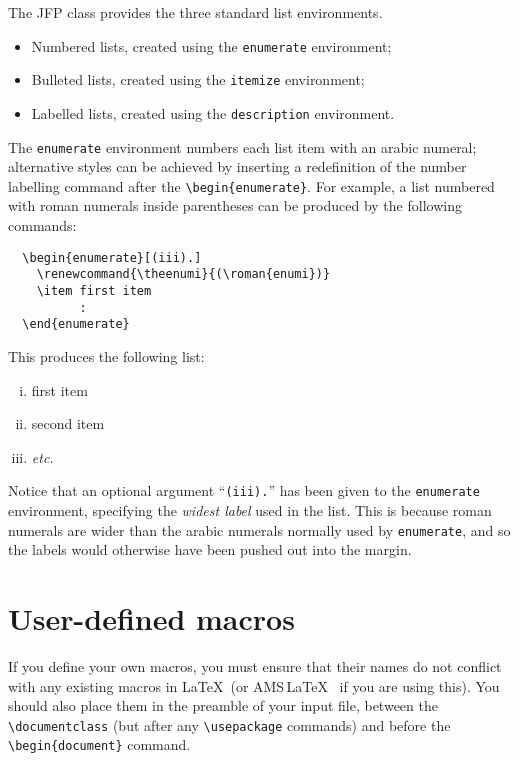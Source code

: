 \documentclass{jfp1}
\providecommand\AMSLaTeX{AMS\,\LaTeX}
\newcommand\etc{\emph{etc.}}
\begin{document}
The JFP class provides the three standard list environments.
\begin{itemize}
  \item Numbered lists, created using the \verb"enumerate" environment;
  \item Bulleted lists, created using the \verb"itemize" environment;
  \item Labelled lists, created using the \verb"description" environment.
\end{itemize}
The \verb"enumerate" environment numbers each list item with an arabic numeral;
alternative styles can be achieved by inserting a redefinition of the
number labelling command after the \verb"\begin{enumerate}". For example, a
list numbered with roman numerals inside parentheses can be produced by the
following commands:
%
\begin{verbatim}
  \begin{enumerate}[(iii).]
    \renewcommand{\theenumi}{(\roman{enumi})}
    \item first item
          :
  \end{enumerate}
\end{verbatim}
%
This produces the following list:
%
\begin{enumerate}[(iii).]
  \renewcommand{\theenumi}{(\roman{enumi})}
  \item first item
  \item second item
  \item \etc
\end{enumerate}
%
Notice that an optional argument ``\verb"(iii)."'' has been given to the
\verb"enumerate" environment, specifying the \emph{widest label} used in the
list. This is because roman numerals are wider than the arabic numerals
normally used by \verb"enumerate", and so the labels would otherwise have been
pushed out into the margin.

\section{User-defined macros}

If you define your own macros, you must ensure that their names do not
conflict with any existing macros in \LaTeX\ (or \AMSLaTeX\ %
if you are using this). You should also place them in the preamble of
your input file, between the \verb"\documentclass" (but after any
\verb"\usepackage" commands) and before the \verb"\begin{document}" command.
\end{document}
